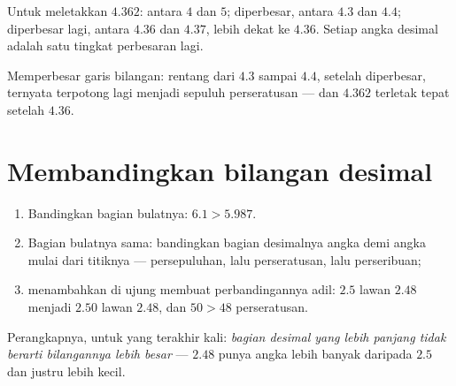 \begin{example}\label{ex:g5:decimals:line}
Untuk meletakkan $4.362$: antara $4$ dan $5$; diperbesar, antara
$4.3$ dan $4.4$; diperbesar lagi, antara $4.36$ dan $4.37$, lebih
dekat ke $4.36$. Setiap angka desimal adalah satu tingkat perbesaran lagi.
\end{example}

\begin{omfigure}

{\small Memperbesar garis bilangan: rentang dari $4.3$ sampai $4.4$,
setelah diperbesar, ternyata terpotong lagi menjadi sepuluh
perseratusan --- dan $4.362$ terletak tepat setelah $4.36$.}
\end{omfigure}

\section{Membandingkan bilangan desimal}

\begin{method}\label{met:g5:decimals:compare}
\begin{enumerate}
  \item Bandingkan bagian bulatnya: $6.1 > 5.987$.
  \item Bagian bulatnya sama: bandingkan bagian desimalnya angka
        demi angka mulai dari titiknya --- persepuluhan, lalu
        perseratusan, lalu perseribuan;
  \item menambahkan  di ujung membuat perbandingannya adil:
        $2.5$ lawan $2.48$ menjadi $2.50$ lawan $2.48$, dan
        $50 > 48$ perseratusan.
\end{enumerate}
Perangkapnya, untuk yang terakhir kali: \emph{bagian desimal yang
lebih panjang tidak berarti bilangannya lebih besar} --- $2.48$ punya angka lebih banyak daripada $2.5$ dan justru lebih kecil.
\end{method}

